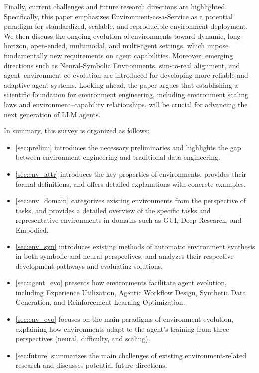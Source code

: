 \documentclass{llmxive}
\begin{document}
Finally, current challenges and future research directions are highlighted. Specifically, this paper emphasizes Environment-as-a-Service as a potential paradigm for standardized, scalable, and reproducible environment deployment. We then discuss the ongoing evolution of environments toward dynamic, long-horizon, open-ended, multimodal, and multi-agent settings, which impose fundamentally new requirements on agent capabilities. Moreover, emerging directions such as Neural-Symbolic Environments, sim-to-real alignment, and agent–environment co-evolution are introduced for developing more reliable and adaptive agent systems. Looking ahead, the paper argues that establishing a scientific foundation for environment engineering, including environment scaling laws and environment–capability relationships, will be crucial for advancing the next generation of LLM agents.

\vspace{3pt}

In summary, this survey is organized as follows: 
\begin{itemize}
    \item \cref{sec:prelimi} introduces the necessary preliminaries and highlights the gap between environment engineering and traditional data engineering.
    \item \cref{sec:env_attr} introduces the key properties of environments, provides their formal definitions, and offers detailed explanations with concrete examples.
    \item \cref{sec:env_domain} categorizes existing environments from the perspective of tasks, and provides a detailed overview of the specific tasks and representative environments in domains such as GUI, Deep Research, and Embodied.
    \item \cref{sec:env_syn} introduces existing methods of automatic environment synthesis in both symbolic and neural perspectives, and analyzes their respective development pathways and evaluating solutions.
    \item \cref{sec:agent_evo} presents how environments facilitate agent evolution, including Experience Utilization, Agentic Workflow Design, Synthetic Data Generation, and Reinforcement Learning Optimization.
    \item \cref{sec:env_evo} focuses on the main paradigms of environment evolution, explaining how environments adapt to the agent’s training from three perspectives (neural, difficulty, and scaling).
    \item \cref{sec:future} summarizes the main challenges of existing environment-related research and discusses potential future directions.
\end{itemize}
\end{document}
